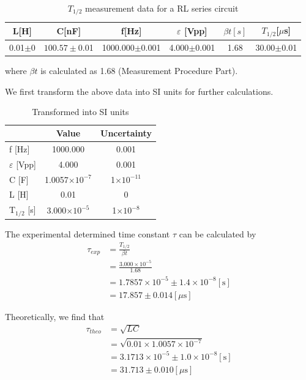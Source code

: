 \documentclass[a4paper]{article}
\begin{document}
\begin{table}[htbp]
	\centering
	\begin{tabular}{cccccc}
		\hline
		L[H]       & C[nF]           & f[Hz]              & $\varepsilon$ [Vpp] & $\beta t[s]$ & $T_{1/2}$[$\mu$s] \\
		\hline
		0.01$\pm$0 & $100.57\pm$0.01 & 1000.000$\pm$0.001 & 4.000$\pm$0.001     & 1.68         & 30.00$\pm$0.01    \\
		\hline
	\end{tabular}%
	\caption{$T_{1/2}$ measurement data for a RL series circuit}
\end{table}
where $\beta t$ is calculated as 1.68 (Measurement Procedure Part).

We first transform the above data into SI units for further calculations.
\begin{table}[!htbp]
	\centering
	\begin{tabular}{l c c}
		\hline
		                    & Value                  & Uncertainty        \\
		\hline
		f [Hz]              & 1000.000               & 0.001              \\
		$\varepsilon$ [Vpp] & 4.000                  & 0.001              \\
		C [F]               & 1.0057$\times 10^{-7}$ & 1$\times 10^{-11}$ \\
		L [H]               & 0.01                   & 0                  \\
		T$_{1/2}$ [s]       & 3.000$\times 10^{-5}$  & 1$\times 10^{-8}$  \\
		\hline
	\end{tabular}
	\caption{Transformed into SI units}
\end{table}

The experimental determined time constant $\tau$ can be calculated by
\begin{align*}
	\tau_{exp}
	 & =\frac{T_{1/2}}{\beta t}                             \\
	 & =\frac{3.000\times 10^{-5}}{1.68}                    \\
	 & =1.7857\times 10^{-5}\pm 1.4\times 10^{-8}[\text{s}] \\
	 & =17.857\pm 0.014[\mu \text{s}]
\end{align*}

Theoretically, we find that
\begin{align*}
	\tau_{theo}
	 & =\sqrt{LC}                                           \\
	 & =\sqrt{0.01\times 1.0057\times 10^{-7}}              \\
	 & =3.1713\times 10^{-5}\pm 1.0\times 10^{-8}[\text{s}] \\
	 & =31.713\pm 0.010[\mu \text{s}]
\end{align*}
\end{document}
